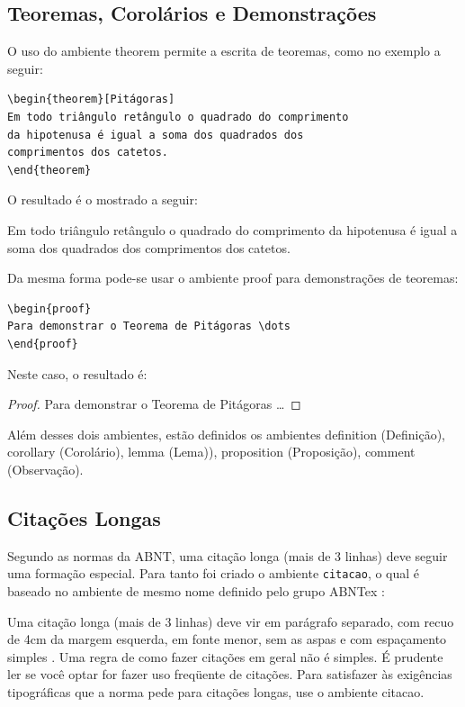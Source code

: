 \subsection{Teoremas, Corolários e Demonstrações}
\label{sec:teor}
 O uso do ambiente \textsf{theorem} permite a escrita de teoremas, como no exemplo a seguir:
\begin{verbatim}
\begin{theorem}[Pitágoras]
Em todo triângulo retângulo o quadrado do comprimento
da hipotenusa é igual a soma dos quadrados dos
comprimentos dos catetos.
\end{theorem}
\end{verbatim}

O resultado é o mostrado a seguir:

\begin{theorem}[Pitágoras]
Em todo triângulo retângulo o quadrado do comprimento da hipotenusa é igual a soma dos quadrados dos comprimentos dos catetos.
\end{theorem}

Da mesma forma pode-se usar o ambiente \textsf{proof} para demonstrações de teoremas:
\begin{verbatim}
\begin{proof}
Para demonstrar o Teorema de Pitágoras \dots
\end{proof}
\end{verbatim}

Neste caso, o resultado é:
\begin{proof}
Para demonstrar o Teorema de Pitágoras \dots
\end{proof}

Além desses dois ambientes, estão definidos os ambientes \textsf{definition} (Definição), \textsf{corollary} (Corolário), \textsf{lemma} (Lema)), \textsf{proposition} (Proposição), \textsf{comment} (Observação).

\subsection{Citações Longas}
\label{sec:citacoes}

Segundo as normas da ABNT, uma citação longa (mais de 3 linhas) deve seguir uma formação especial. Para tanto foi criado o ambiente \verb|citacao|, o qual é baseado no ambiente de mesmo nome definido pelo grupo ABNTex \cite{abnt-classe-doc}:
\begin{citacao}
Uma citação longa (mais de 3 linhas) deve vir em parágrafo separado,
com recuo de 4cm da margem esquerda, em fonte menor, sem as aspas
\cite[4.4]{NBR10520:2001} e com espaçamento simples \cite[5.3]{NBR14724:2001}.
Uma regra de como fazer citações em geral não é simples. É prudente
ler \cite{NBR10520:2001} se você optar for fazer uso freqüente de citações.
Para satisfazer às exigências tipográficas que a norma pede para
citações longas, use o ambiente citacao.
\end{citacao}

